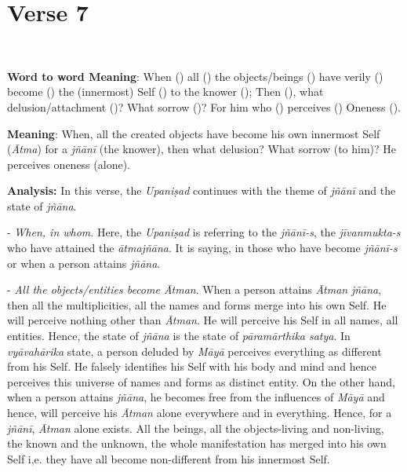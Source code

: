 \chapter{Verse 7}

\begin{moolashloka}
\\
\end{moolashloka}

\textbf{Word to word Meaning}: When () all () the objects/beings () have verily () become () the (innermost) Self () to the knower (); Then (), what delusion/attachment ()? What sorrow ()? For him who () perceives () Oneness ().

\textbf{Meaning}: When, all the created objects have become his own innermost Self (\emph{Ātma}) for a \emph{jñānī} (the knower), then what delusion? What sorrow (to him)? He perceives oneness (alone).

\textbf{Analysis:} In this verse, the \emph{Upaniṣad} continues with the theme of \emph{jñānī} and the state of \emph{jñāna}.

- \emph{When, in whom}. Here, the \emph{Upaniṣad} is referring to the \emph{jñānī-s}, the \emph{jīvanmukta-s} who have attained the \emph{ātmajñāna}. It is saying, in those who have become \emph{jñānī-s} or when a person attains \emph{jñāna}.

- \emph{All the objects/entities become Ātman}. When a person attains \emph{Ātman} \emph{jñāna}, then all the multiplicities, all the names and forms merge into his own Self. He will perceive nothing other than \emph{Ātman}. He will perceive his Self in all names, all entities. Hence, the state of \emph{jñāna} is the state of \emph{pāramārthika satya}. In \emph{vyāvahārika} state, a person deluded by \emph{Māyā} perceives everything as different from his Self. He falsely identifies his Self with his body and mind and hence perceives this universe of names and forms as distinct entity. On the other hand, when a person attains \emph{jñāna}, he becomes free from the influences of \emph{Māyā} and hence, will perceive his \emph{Ātman} alone everywhere and in everything. Hence, for a \emph{jñānī}, \emph{Ātman} alone exists. All the beings, all the objects-living and non-living, the known and the unknown, the whole manifestation has merged into his own Self i,e. they have all become non-different from his innermost Self.

